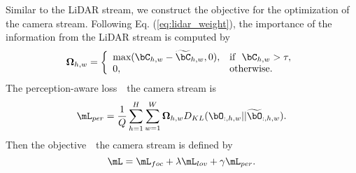 \documentclass[10pt,twocolumn,letterpaper]{article}
\begin{document}
Similar to the LiDAR stream, we construct the objective for the optimization of the camera stream.
Following Eq. (\ref{eq:lidar_weight}), the importance of the information from the LiDAR stream is computed by
\begin{equation}
\label{eq:camera_weight}
    \mathbf{\Omega}_{h,w} = \left\{
    \begin{array}{ll}
        \text{max}(\bC_{h,w} - \widetilde{\bC}_{h,w},0), &  \text{if}~~\bC_{h,w} >\tau, \\
        0, &  \text{otherwise}. \\
    \end{array}
    \right.
\end{equation}
The perception-aware loss~\wrt~the camera stream is
\begin{equation}
\label{eq:camera_percept}
    \mL_{per} = \frac{1}{Q}\sum_{h=1}^{H}\sum_{w=1}^{W}\mathbf{\Omega}_{h,w} D_{KL}(\bO_{:,h,w}||\widetilde{\bO}_{:,h,w}).
\end{equation}
Then the objective~\wrt~the camera stream is defined by
\begin{equation}
\label{eq:camera_obj}
    \mL = \mL_{foc} + \lambda\mL_{lov} + \gamma\mL_{per}.
\end{equation}
\end{document}
